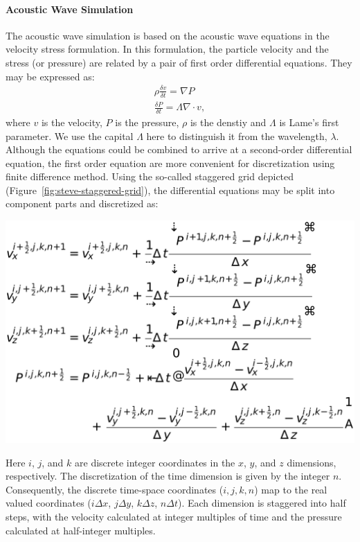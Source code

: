 \paragraph{Acoustic Wave Simulation}
The acoustic wave simulation is based on the acoustic wave equations in the
velocity stress formulation. In this formulation, the particle velocity and the
stress (or pressure) are related by a pair of first order differential
equations. They may be expressed as:
\begin{align*}
\rho \frac{\delta v}{\delta t} = \nabla P\\
\frac{\delta P}{\delta t} = \Lambda \nabla \cdot v,
\end{align*}
where $v$ is the velocity, $P$ is the pressure, $\rho$ is the denstiy and
$\Lambda$ is Lame's first parameter.  We use the capital $\Lambda$ here to
distinguish it from the wavelength, $\lambda$. Although the equations could be
combined to arrive at a second-order differential equation, the first order
equation are more convenient for discretization using finite difference method.
Using the so-called staggered grid depicted (Figure~\ref{fig:steve-staggered-grid}), the differential
equations may be split into component parts and discretized as:

\centerline{\includegraphics[width=0.55\linewidth]{steve/figs/image7.png}}

Here $i$, $j$, and $k$ are discrete integer coordinates in the $x$, $y$, and
$z$ dimensions, respectively. The discretization of the time dimension is given
by the integer $n$. Consequently, the discrete time-space coordinates ($i, j,
k, n$) map to the real valued coordinates ($i \Delta x$, $j \Delta y$, $k\Delta
z$, $n \Delta t$). Each dimension is staggered into half steps, with the
velocity calculated at integer multiples of time and the pressure calculated at
half-integer multiples. 

